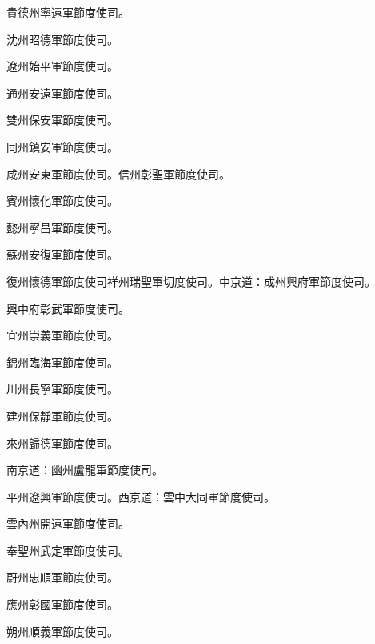 \begin{pinyinscope}
 貴德州寧遠軍節度使司。



 沈州昭德軍節度使司。



 遼州始平軍節度使司。



 通州安遠軍節度使司。



 雙州保安軍節度使司。



 同州鎮安軍節度使司。



 咸州安東軍節度使司。信州彰聖軍節度使司。



 賓州懷化軍節度使司。



 懿州寧昌軍節度使司。



 蘇州安復軍節度使司。



 復州懷德軍節度使司祥州瑞聖軍切度使司。中京道：成州興府軍節度使司。



 興中府彰武軍節度使司。



 宜州崇義軍節度使司。



 錦州臨海軍節度使司。



 川州長寧軍節度使司。



 建州保靜軍節度使司。



 來州歸德軍節度使司。



 南京道：幽州盧龍軍節度使司。



 平州遼興軍節度使司。西京道：雲中大同軍節度使司。



 雲內州開遠軍節度使司。



 奉聖州武定軍節度使司。



 蔚州忠順軍節度使司。



 應州彰國軍節度使司。



 朔州順義軍節度使司。




\end{pinyinscope}
